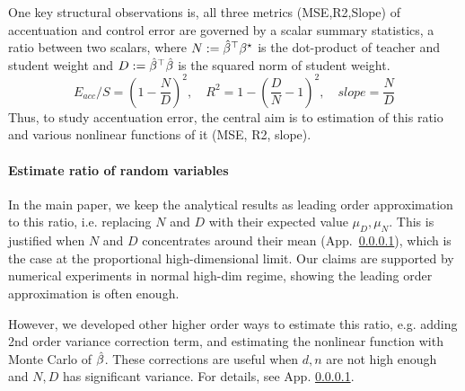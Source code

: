 \documentclass{article}
\theoremstyle{plain}
\theoremstyle{definition}
\begin{document}

One key structural observations is, all three metrics (MSE,R2,Slope) of accentuation and control error are governed by a scalar summary statistics,
a ratio between two scalars, where $N:={\hat{\beta}}^{\top}{\beta^{\star}}$ is the dot-product of teacher and student weight and $D:={\hat{\beta}}^{\top}\hat{\beta}$ is the squared norm of student weight.
\begin{equation}
E_{acc}/S=(1-\frac{N}{D})^2,\quad R^2=1-(\frac DN-1)^2,\quad slope=\frac ND \label{eq:acc_metric_ND_depen}
\end{equation}
Thus, to study accentuation error, the central aim is to estimation of this ratio and various nonlinear functions of it (MSE, R2, slope).
\paragraph{Estimate ratio of random variables}
In the main paper, we keep the analytical results as leading order approximation to this ratio, i.e. replacing $N$ and $D$ with their expected value $\mu_D,\mu_N$.
This is justified when $N$ and $D$ concentrates around their mean (App.~\ref{}), which is the case at the proportional high-dimensional limit. Our claims are supported by numerical experiments in normal high-dim regime, showing the leading order approximation is often enough.

However, we developed other higher order ways to estimate this ratio, e.g. adding 2nd order variance correction term, and estimating the nonlinear function with Monte Carlo of $\hat{\beta}$. These corrections are useful when $d,n$ are not high enough and $N,D$ has significant variance. For details, see App. \ref{}.
\end{document}
